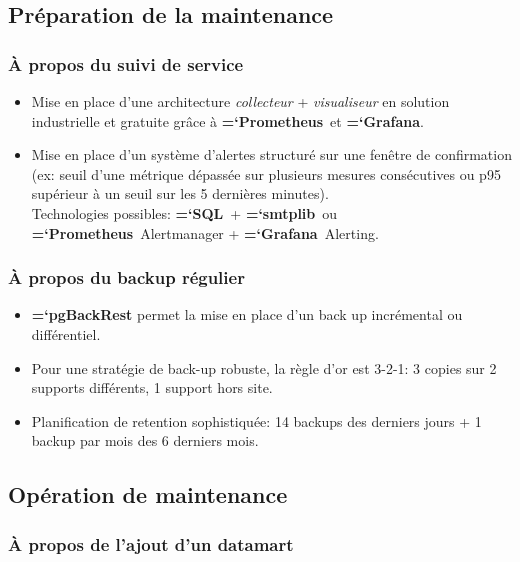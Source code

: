 \documentclass[11pt]{article}
\renewcommand{\emph}[1]{\textsl{#1}}
\newcommand{\program}[1]{{\ttfamily\bfseries\hyphenchar\font=`\-\color{Maroon}#1}}
\newcommand{\techno}[1]{{\ttfamily\bfseries\hyphenchar\font=`\-\color{Sienna}#1}}
\newcommand{\sql}{\techno{SQL}}
\newcommand{\smtplib}{\techno{smtplib}}
\newcommand{\prometheus}{\techno{Prometheus}}
\newcommand{\grafana}{\techno{Grafana}}
\begin{document}
\subsection{Préparation de la maintenance}

\subsubsection{À propos du suivi de service} \label{ann:suivi_de_service_aller_plus_loin}

\begin{itemize}
    \item Mise en place d'une architecture \emph{collecteur} + \emph{visualiseur} en solution industrielle et gratuite grâce à \prometheus\ et \grafana.
    \item Mise en place d'un système d'alertes structuré sur une fenêtre de confirmation (ex: seuil d'une métrique dépassée sur plusieurs mesures consécutives ou p95 supérieur à un seuil sur les 5 dernières minutes). \\ Technologies possibles: \sql\ + \smtplib\ ou \prometheus\ Alertmanager + \grafana\ Alerting.
\end{itemize}

\subsubsection{À propos du backup régulier} \label{ann:backup_regulier_aller_plus_loin}

\begin{itemize}
    \item \program{pgBackRest} permet la mise en place d'un back up incrémental ou différentiel.
    \item Pour une stratégie de back-up robuste, la règle d'or est 3-2-1: 3 copies sur 2 supports différents, 1 support hors site.
    \item Planification de retention sophistiquée: 14 backups des derniers jours + 1 backup par mois des 6 derniers mois.
\end{itemize}

\subsection{Opération de maintenance}

\subsubsection{À propos de l'ajout d'un datamart} \label{ann:ajout_datamart_aller_plus_loin}
\end{document}
